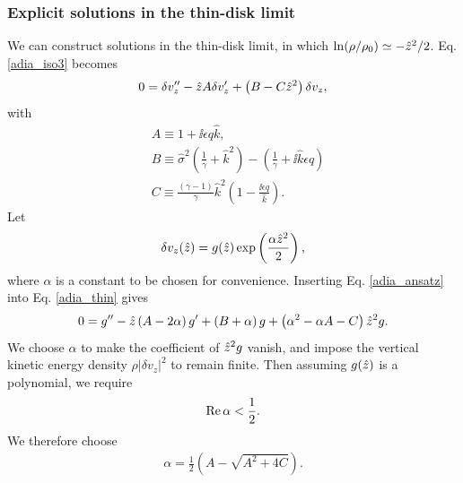 \subsubsection{Explicit solutions in the thin-disk limit}
We can construct solutions in the thin-disk limit, in which 
$\ln(\rho/\rho_0) \simeq -\hat{z}^2/2$. Eq. \ref{adia_iso3} becomes   
\begin{align}
  0 = \delta v_z^{\prime\prime} - \hat{z} A \delta v_z^\prime + \left(B
    - C \hat{z}^2\right)\delta v_z, \label{adia_iso4} 
\end{align}
with
\begin{align}
  &A \equiv 1 + \ii \epsilon q \hat{k},\\
  &B \equiv \hat{\sigma}^2\left(\frac{1}{\gamma} + \hat{k}^2\right) -
  \left(\frac{1}{\gamma} + \ii \hat{k} \epsilon q\right)\\
  &C \equiv \frac{\left(\gamma-1\right)}{\gamma}\hat{k}^2\left(1 - \frac{\ii
      \epsilon q}{\hat{k}}\right).\label{adia_thin}
\end{align}
Let
\begin{align}
  \delta v_z(\hat{z}) =
  g(\hat{z})\exp\left(\frac{\alpha\hat{z}^2}{2}\right), \label{adia_ansatz}
\end{align}
where $\alpha$ is a constant to be chosen for convenience. Inserting
Eq. \ref{adia_ansatz} into Eq. \ref{adia_thin} gives
\begin{align}
  0 = g^{\prime\prime} - \hat{z}\left(A - 2\alpha\right)g^\prime + \left(B +
    \alpha\right)g
  +\left(\alpha^2 - \alpha A - C\right)\hat{z}^2 g.
\end{align}
We choose $\alpha$ to make the coefficient of $\hat{z}^2g$
vanish, and impose the vertical kinetic energy density
$\rho|\delta v_z|^2$ to remain finite. Then assuming $g(\hat{z})$ is a
polynomial, we require  
\begin{align}
  \operatorname{Re}\alpha < \frac{1}{2}. 
\end{align}
We therefore choose 
\begin{align}
  \alpha = \frac{1}{2}\left(A - \sqrt{A^2 + 4C}\right). 
\end{align} 

